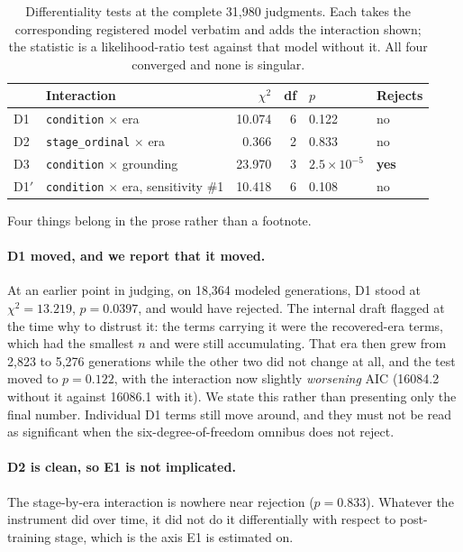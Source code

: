 \begin{table}[htbp]
\centering
\small
\caption{Differentiality tests at the complete 31{,}980 judgments. Each takes the
corresponding registered model verbatim and adds the interaction shown; the
statistic is a likelihood-ratio test against that model without it. All four
converged and none is singular.}
\label{tab:t6}
\begin{tabular}{@{}l l r r l l@{}}
\toprule
 & Interaction & $\chi^2$ & df & $p$ & Rejects \\
\midrule
D1 & \texttt{condition} $\times$ era              & 10.074 & 6 & 0.122 & no \\
D2 & \texttt{stage\_ordinal} $\times$ era         & 0.366  & 2 & 0.833 & no \\
D3 & \texttt{condition} $\times$ grounding        & 23.970 & 3 & $2.5 \times 10^{-5}$ & \textbf{yes} \\
D1$'$ & \texttt{condition} $\times$ era, sensitivity \#1 & 10.418 & 6 & 0.108 & no \\
\bottomrule
\end{tabular}
\end{table}

Four things belong in the prose rather than a footnote.

\paragraph{D1 moved, and we report that it moved.}
At an earlier point in judging, on 18{,}364 modeled generations, D1 stood at
$\chi^2 = 13.219$, $p = 0.0397$, and would have rejected. The internal draft
flagged at the time why to distrust it: the terms carrying it were the
recovered-era terms, which had the smallest $n$ and were still accumulating. That
era then grew from 2{,}823 to 5{,}276 generations while the other two did not
change at all, and the test moved to $p = 0.122$, with the interaction now
slightly \emph{worsening} AIC (16084.2 without it against 16086.1 with it). We
state this rather than presenting only the final number. Individual D1 terms
still move around, and they must not be read as significant when the
six-degree-of-freedom omnibus does not reject.

\paragraph{D2 is clean, so E1 is not implicated.}
The stage-by-era interaction is nowhere near rejection ($p = 0.833$). Whatever
the instrument did over time, it did not do it differentially with respect to
post-training stage, which is the axis E1 is estimated on.

